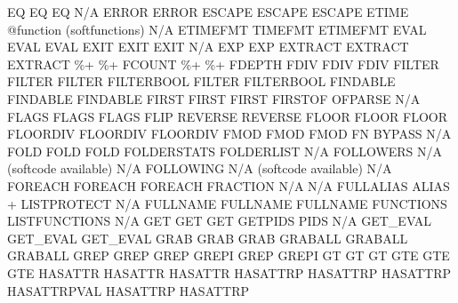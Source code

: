 \documentclass[letterpaper,10pt,english]{sphinxmanual}
\begin{document}
\begin{description}
EQ                      EQ                           EQ
N/A                     ERROR                        ERROR
ESCAPE                  ESCAPE                       ESCAPE
ETIME                   @function (softfunctions)    N/A
ETIMEFMT                TIMEFMT                      ETIMEFMT
EVAL                    EVAL                         EVAL
EXIT                    EXIT                         EXIT
N/A                     EXP                          EXP
EXTRACT                 EXTRACT                      EXTRACT
\%+                      \%+                           FCOUNT
\%+                      \%+                           FDEPTH
FDIV                    FDIV                         FDIV
FILTER                  FILTER                       FILTER
FILTERBOOL              FILTER                       FILTERBOOL
FINDABLE                FINDABLE                     FINDABLE
FIRST                   FIRST                        FIRST
FIRSTOF                 OFPARSE                      N/A
FLAGS                   FLAGS                        FLAGS
FLIP                    REVERSE                      REVERSE
FLOOR                   FLOOR                        FLOOR
FLOORDIV                FLOORDIV                     FLOORDIV
FMOD                    FMOD                         FMOD
FN                      BYPASS                       N/A
FOLD                    FOLD                         FOLD
FOLDERSTATS             FOLDERLIST                   N/A
FOLLOWERS               N/A (softcode available)     N/A
FOLLOWING               N/A (softcode available)     N/A
FOREACH                 FOREACH                      FOREACH
FRACTION                N/A                          N/A
FULLALIAS               ALIAS + LISTPROTECT          N/A
FULLNAME                FULLNAME                     FULLNAME
FUNCTIONS               LISTFUNCTIONS                N/A
GET                     GET                          GET
GETPIDS                 PIDS                         N/A
GET\_EVAL                GET\_EVAL                     GET\_EVAL
GRAB                    GRAB                         GRAB
GRABALL                 GRABALL                      GRABALL
GREP                    GREP                         GREP
GREPI                   GREP                         GREPI
GT                      GT                           GT
GTE                     GTE                          GTE
HASATTR                 HASATTR                      HASATTR
HASATTRP                HASATTRP                     HASATTRP
HASATTRPVAL             HASATTRP                     HASATTRP

\end{description}
\end{document}
